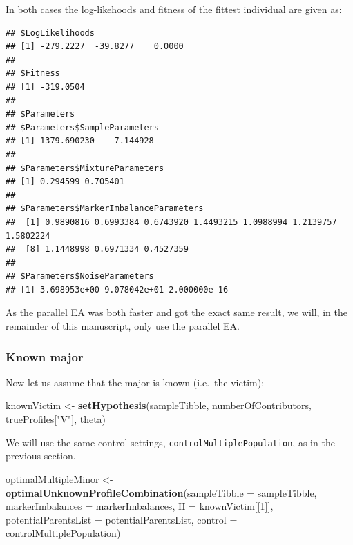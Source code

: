 \documentclass[]{article}
\newenvironment{Shaded}{\begin{snugshade}}{\end{snugshade}}
\newcommand{\KeywordTok}[1]{\textcolor[rgb]{0.13,0.29,0.53}{\textbf{#1}}}
\newcommand{\DataTypeTok}[1]{\textcolor[rgb]{0.13,0.29,0.53}{#1}}
\newcommand{\DecValTok}[1]{\textcolor[rgb]{0.00,0.00,0.81}{#1}}
\newcommand{\StringTok}[1]{\textcolor[rgb]{0.31,0.60,0.02}{#1}}
\newcommand{\OperatorTok}[1]{\textcolor[rgb]{0.81,0.36,0.00}{\textbf{#1}}}
\newcommand{\NormalTok}[1]{#1}
\begin{document}
In both cases the log-likehoods and fitness of the fittest individual
are given as:

\begin{Shaded}
\end{Shaded}

\begin{verbatim}
## $LogLikelihoods
## [1] -279.2227  -39.8277    0.0000
## 
## $Fitness
## [1] -319.0504
## 
## $Parameters
## $Parameters$SampleParameters
## [1] 1379.690230    7.144928
## 
## $Parameters$MixtureParameters
## [1] 0.294599 0.705401
## 
## $Parameters$MarkerImbalanceParameters
##  [1] 0.9890816 0.6993384 0.6743920 1.4493215 1.0988994 1.2139757 1.5802224
##  [8] 1.1448998 0.6971334 0.4527359
## 
## $Parameters$NoiseParameters
## [1] 3.698953e+00 9.078042e+01 2.000000e-16
\end{verbatim}

As the parallel EA was both faster and got the exact same result, we
will, in the remainder of this manuscript, only use the parallel EA.

\subsubsection{Known major}\label{known-major}

Now let us assume that the major is known (i.e.~the victim):

\begin{Shaded}
\begin{Highlighting}[]
\NormalTok{knownVictim <-}\StringTok{ }\KeywordTok{setHypothesis}\NormalTok{(sampleTibble, numberOfContributors, trueProfiles[}\StringTok{"V"}\NormalTok{], theta)}
\end{Highlighting}
\end{Shaded}

We will use the same control settings,
\texttt{controlMultiplePopulation}, as in the previous section.

\begin{Shaded}
\begin{Highlighting}[]
\NormalTok{optimalMultipleMinor <-}\StringTok{ }\KeywordTok{optimalUnknownProfileCombination}\NormalTok{(}\DataTypeTok{sampleTibble =}\NormalTok{ sampleTibble,}
                                                         \DataTypeTok{markerImbalances =}\NormalTok{ markerImbalances, }
                                                         \DataTypeTok{H =}\NormalTok{ knownVictim[[}\DecValTok{1}\NormalTok{]], }
                                                         \DataTypeTok{potentialParentsList =}\NormalTok{ potentialParentsList, }
                                                         \DataTypeTok{control =}\NormalTok{ controlMultiplePopulation)}
\end{Highlighting}
\end{Shaded}
\end{document}
